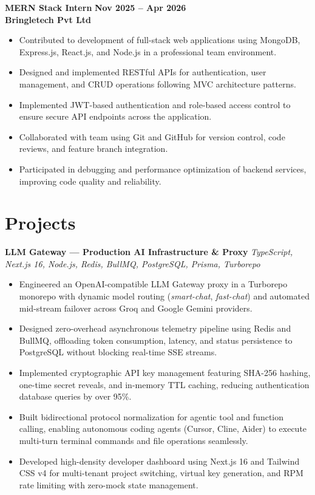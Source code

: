 \documentclass[10pt,a4paper]{article}
\begin{document}
\textbf{MERN Stack Intern} \hfill \textbf{Nov 2025 -- Apr 2026}\\
\textbf{Bringletech Pvt Ltd}
\begin{itemize}
    \item Contributed to development of full-stack web applications using MongoDB, Express.js, React.js, and Node.js in a professional team environment.
    \item Designed and implemented RESTful APIs for authentication, user management, and CRUD operations following MVC architecture patterns.
    \item Implemented JWT-based authentication and role-based access control to ensure secure API endpoints across the application.
    \item Collaborated with team using Git and GitHub for version control, code reviews, and feature branch integration.
    \item Participated in debugging and performance optimization of backend services, improving code quality and reliability.
\end{itemize}

\section{Projects}

\textbf{LLM Gateway — Production AI Infrastructure \& Proxy}
\hfill
\textit{TypeScript, Next.js 16, Node.js, Redis, BullMQ, PostgreSQL, Prisma, Turborepo}

\begin{itemize}
    \item Engineered an OpenAI-compatible LLM Gateway proxy in a Turborepo monorepo with dynamic model routing (\textit{smart-chat}, \textit{fast-chat}) and automated mid-stream failover across Groq and Google Gemini providers.
    
    \item Designed zero-overhead asynchronous telemetry pipeline using Redis and BullMQ, offloading token consumption, latency, and status persistence to PostgreSQL without blocking real-time SSE streams.
    
    \item Implemented cryptographic API key management featuring SHA-256 hashing, one-time secret reveals, and in-memory TTL caching, reducing authentication database queries by over 95\%.
    
    \item Built bidirectional protocol normalization for agentic tool and function calling, enabling autonomous coding agents (Cursor, Cline, Aider) to execute multi-turn terminal commands and file operations seamlessly.
    
    \item Developed high-density developer dashboard using Next.js 16 and Tailwind CSS v4 for multi-tenant project switching, virtual key generation, and RPM rate limiting with zero-mock state management.
\end{itemize}
\end{document}
